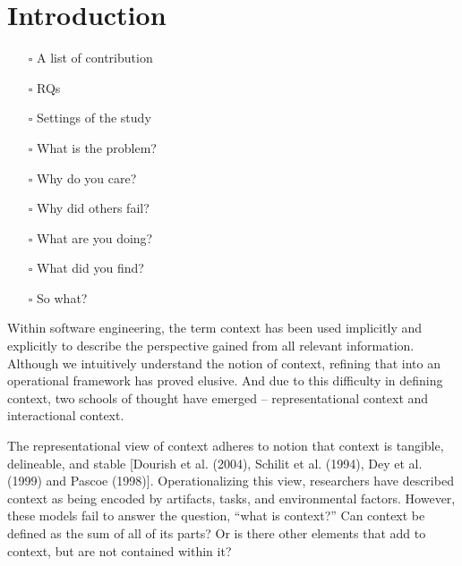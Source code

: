 \section{Introduction}


\begin{itemize}
\item[$\square$] A list of contribution
\item[$\square$] RQs
\item[$\square$] Settings of the study
\item[$\square$] What is the problem?
\item[$\square$] Why do you care?
\item[$\square$] Why did others fail?
\item[$\square$] What are you doing?
\item[$\square$] What did you find?
\item[$\square$] So what?
\end{itemize}


Within software engineering, the term context has been used implicitly and explicitly to describe the perspective gained from all relevant information. Although we intuitively understand the notion of context, refining that into an operational framework has proved elusive. And due to this difficulty in defining context, two schools of thought have emerged -- representational context and interactional context. 
 
The representational view of context adheres to notion that context is tangible, delineable, and stable [Dourish et al. (2004), Schilit et al. (1994), Dey et al. (1999) and Pascoe (1998)]. Operationalizing this view, researchers have described context as being encoded by artifacts, tasks, and environmental factors. However, these models fail to answer the question, “what is context?” Can context be defined as the sum of all of its parts? Or is there other elements that add to context, but are not contained within it? 

